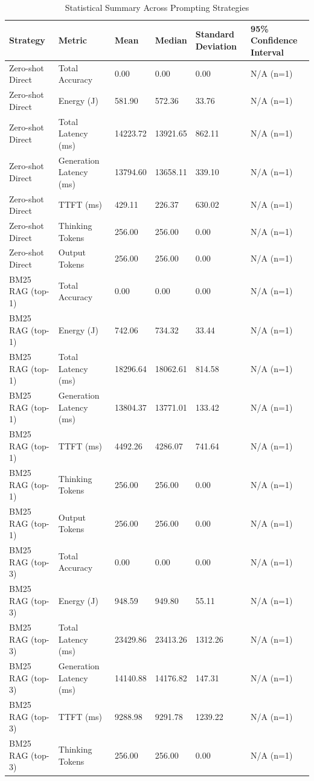 \begin{table}
\caption{Statistical Summary Across Prompting Strategies}
\label{tab:statistical_summary}
\begin{tabular}{llllll}
\toprule
Strategy & Metric & Mean & Median & Standard Deviation & 95\% Confidence Interval \\
\midrule
Zero-shot Direct & Total Accuracy & 0.00 & 0.00 & 0.00 & N/A (n=1) \\
Zero-shot Direct & Energy (J) & 581.90 & 572.36 & 33.76 & N/A (n=1) \\
Zero-shot Direct & Total Latency (ms) & 14223.72 & 13921.65 & 862.11 & N/A (n=1) \\
Zero-shot Direct & Generation Latency (ms) & 13794.60 & 13658.11 & 339.10 & N/A (n=1) \\
Zero-shot Direct & TTFT (ms) & 429.11 & 226.37 & 630.02 & N/A (n=1) \\
Zero-shot Direct & Thinking Tokens & 256.00 & 256.00 & 0.00 & N/A (n=1) \\
Zero-shot Direct & Output Tokens & 256.00 & 256.00 & 0.00 & N/A (n=1) \\
BM25 RAG (top-1) & Total Accuracy & 0.00 & 0.00 & 0.00 & N/A (n=1) \\
BM25 RAG (top-1) & Energy (J) & 742.06 & 734.32 & 33.44 & N/A (n=1) \\
BM25 RAG (top-1) & Total Latency (ms) & 18296.64 & 18062.61 & 814.58 & N/A (n=1) \\
BM25 RAG (top-1) & Generation Latency (ms) & 13804.37 & 13771.01 & 133.42 & N/A (n=1) \\
BM25 RAG (top-1) & TTFT (ms) & 4492.26 & 4286.07 & 741.64 & N/A (n=1) \\
BM25 RAG (top-1) & Thinking Tokens & 256.00 & 256.00 & 0.00 & N/A (n=1) \\
BM25 RAG (top-1) & Output Tokens & 256.00 & 256.00 & 0.00 & N/A (n=1) \\
BM25 RAG (top-3) & Total Accuracy & 0.00 & 0.00 & 0.00 & N/A (n=1) \\
BM25 RAG (top-3) & Energy (J) & 948.59 & 949.80 & 55.11 & N/A (n=1) \\
BM25 RAG (top-3) & Total Latency (ms) & 23429.86 & 23413.26 & 1312.26 & N/A (n=1) \\
BM25 RAG (top-3) & Generation Latency (ms) & 14140.88 & 14176.82 & 147.31 & N/A (n=1) \\
BM25 RAG (top-3) & TTFT (ms) & 9288.98 & 9291.78 & 1239.22 & N/A (n=1) \\
BM25 RAG (top-3) & Thinking Tokens & 256.00 & 256.00 & 0.00 & N/A (n=1) \\

\end{tabular}
\end{table}
